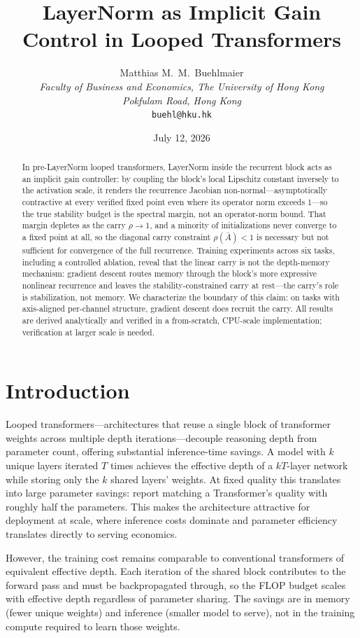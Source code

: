 \documentclass[11pt]{article}
\title{LayerNorm as Implicit Gain Control in Looped Transformers}
\author{Matthias M.\ M.\ Buehlmaier\\
\textit{Faculty of Business and Economics, The University of Hong Kong}\\
\textit{Pokfulam Road, Hong Kong}\\
\texttt{buehl@hku.hk}}
\date{July 12, 2026}
\begin{document}
\maketitle

\begin{abstract}
In pre-LayerNorm looped transformers, LayerNorm inside the recurrent block acts as an implicit gain controller: by coupling the block's local Lipschitz constant inversely to the activation scale, it renders the recurrence Jacobian non-normal---asymptotically contractive at every verified fixed point even where its operator norm exceeds 1---so the true stability budget is the spectral margin, not an operator-norm bound. That margin depletes as the carry $\rho \to 1$, and a minority of initializations never converge to a fixed point at all, so the diagonal carry constraint $\rho(\bar{A}) < 1$ is necessary but not sufficient for convergence of the full recurrence. Training experiments across six tasks, including a controlled ablation, reveal that the linear carry is not the depth-memory mechanism: gradient descent routes memory through the block's more expressive nonlinear recurrence and leaves the stability-constrained carry at rest---the carry's role is stabilization, not memory. We characterize the boundary of this claim: on tasks with axis-aligned per-channel structure, gradient descent does recruit the carry. All results are derived analytically and verified in a from-scratch, CPU-scale implementation; verification at larger scale is needed.
\end{abstract}


\section{Introduction}

Looped transformers---architectures that reuse a single block of transformer weights across multiple depth iterations---decouple reasoning depth from parameter count, offering substantial inference-time savings. A model with $k$ unique layers iterated $T$ times achieves the effective depth of a $kT$-layer network while storing only the $k$ shared layers' weights. At fixed quality this translates into large parameter savings: \citet{parcae2026} report matching a Transformer's quality with roughly half the parameters. This makes the architecture attractive for deployment at scale, where inference costs dominate and parameter efficiency translates directly to serving economics.

However, the training cost remains comparable to conventional transformers of equivalent effective depth. Each iteration of the shared block contributes to the forward pass and must be backpropagated through, so the FLOP budget scales with effective depth regardless of parameter sharing. The savings are in memory (fewer unique weights) and inference (smaller model to serve), not in the training compute required to learn those weights.
\end{document}
